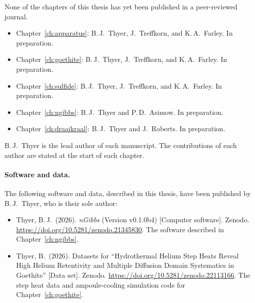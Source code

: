 %


None of the chapters of this thesis has yet been published in a peer-reviewed journal.

\begin{itemize}
  \item Chapter~\ref{ch:apparatus}: B.\,J.\ Thyer, J.\ Treffkorn, and K.\,A.\ Farley. In preparation.
  \item Chapter~\ref{ch:goethite}: B.\,J.\ Thyer, J.\ Treffkorn, and K.\,A.\ Farley. In preparation.
  \item Chapter~\ref{ch:sulfide}: B.\,J.\ Thyer, J.\ Treffkorn, and K.\,A.\ Farley. In preparation.
  \item Chapter~\ref{ch:ngibbs}: B.\,J.\ Thyer and P.\,D.\ Asimow. In preparation.
  \item Chapter~\ref{ch:draaikraal}: B.\,J.\ Thyer and J.\ Roberts. In preparation.
\end{itemize}

\noindent B.\,J.\ Thyer is the lead author of each manuscript. The contributions of
each author are stated at the start of each chapter.

\paragraph{Software and data.} The following software and data, described in this
thesis, have been published by B.\,J.\ Thyer, who is their sole author:
\begin{itemize}
  \item Thyer, B.\,J.\ (2026). \textit{nGibbs} (Version v0.1.0b4) [Computer software].
        Zenodo. \url{https://doi.org/10.5281/zenodo.21345830}.
        The software described in Chapter~\ref{ch:ngibbs}.
  \item Thyer, B.\ (2026). Datasets for ``Hydrothermal Helium Step Heats Reveal High
        Helium Retentivity and Multiple Diffusion Domain Systematics in Goethite''
        [Data set]. Zenodo. \url{https://doi.org/10.5281/zenodo.22113166}.
        The step heat data and ampoule-cooling simulation code for Chapter~\ref{ch:goethite}.
\end{itemize}

